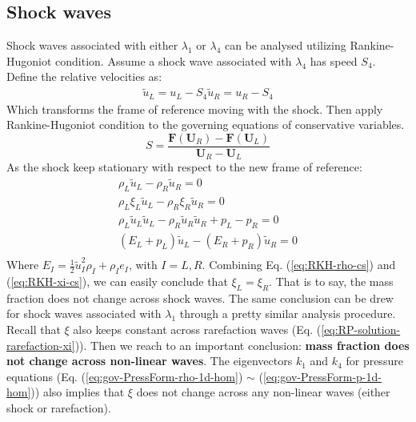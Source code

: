\subsection{Shock waves}
Shock waves associated with either $\lambda_1$ or $\lambda_4$ can be analysed utilizing Rankine-Hugoniot condition. Assume a shock wave associated with $\lambda_4$ has speed $S_4$. Define the relative velocities as:
\begin{eqnarray}
\tilde{u}_L = u_L - S_4
\tilde{u}_R = u_R - S_4
\end{eqnarray}
Which transforms the frame of reference moving with the shock. Then apply Rankine-Hugoniot condition to the governing equations of conservative variables.
\begin{equation}
S=\frac{\textbf{F}(\textbf{U}_R)-\textbf{F}(\textbf{U}_L)}{\textbf{U}_R - \textbf{U}_L}
\end{equation}
As the shock keep stationary with respect to the new frame of reference:
\begin{eqnarray}
\rho_L \tilde{u}_L - \rho_R \tilde{u}_R = 0 \label{eq:RKH-rho-cs}\\
\rho_L \xi_L \tilde{u}_L - \rho_R \xi_R \tilde{u}_R = 0 \label{eq:RKH-xi-cs} \\
\rho_L \tilde{u}_L \tilde{u}_L - \rho_R \tilde{u}_R \tilde{u}_R + p_L - p_R = 0 \label{eq:RKH-u-cs} \\
(E_L + p_L) \tilde{u}_L - (E_R + p_R) \tilde{u}_R = 0 \label{eq:RKH-E-cs}\\
\end{eqnarray}
Where $E_I = \frac{1}{2} \tilde{u}^2_I \rho_I + \rho_I e_I$, with $I = L , R$.
Combining Eq. (\ref{eq:RKH-rho-cs}) and (\ref{eq:RKH-xi-cs}), we can easily conclude that $\xi_L = \xi_R$. That is to say, the mass fraction does not change across shock waves. The same conclusion can be drew for shock waves associated with $\lambda_1$ through a pretty similar analysis procedure. Recall that $\xi$ also keeps constant across rarefaction waves (Eq. (\ref{eq:RP-solution-rarefaction-xi})). Then we reach to an important conclusion: \textbf{mass fraction does not change across non-linear waves}. The eigenvectors $k_1$ and $k_4$ for pressure equations (Eq. (\ref{eq:gov-PressForm-rho-1d-hom}) $\sim$ (\ref{eq:gov-PressForm-p-1d-hom})) also implies that $\xi$ does not change across any non-linear waves (either shock or rarefaction).

